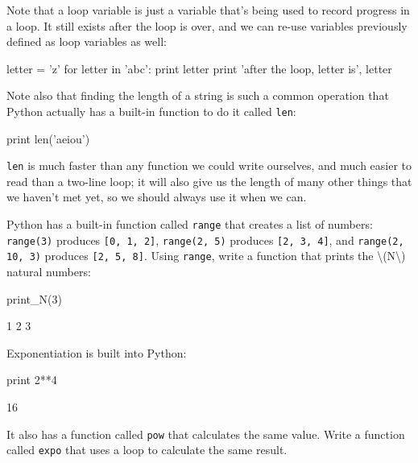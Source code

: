 Note that a loop variable is just a variable that's being used to record
progress in a loop. It still exists after the loop is over, and we can
re-use variables previously defined as loop variables as well:

\begin{VerbIn}
letter = 'z'
for letter in 'abc':
    print letter
print 'after the loop, letter is', letter
\end{VerbIn}

Note also that finding the length of a string is such a common operation
that Python actually has a built-in function to do it called
\texttt{len}:

\begin{VerbIn}
print len('aeiou')
\end{VerbIn}

\texttt{len} is much faster than any function we could write ourselves,
and much easier to read than a two-line loop; it will also give us the
length of many other things that we haven't met yet, so we should always
use it when we can.

\begin{challenge}
  Python has a built-in function called \texttt{range} that creates a
  list of numbers: \texttt{range(3)} produces \texttt{{[}0, 1, 2{]}},
  \texttt{range(2, 5)} produces \texttt{{[}2, 3, 4{]}}, and
  \texttt{range(2, 10, 3)} produces \texttt{{[}2, 5, 8{]}}. Using
  \texttt{range}, write a function that prints the
  \textbackslash{}(N\textbackslash{}) natural numbers:
\begin{VerbIn}
print_N(3)
\end{VerbIn}

\begin{VerbOut}
1 2 3
\end{VerbOut}
\end{challenge}

\begin{challenge}
  Exponentiation is built into Python:
\begin{VerbIn}
print 2**4
\end{VerbIn}

\begin{VerbOut}
16
\end{VerbOut}
  It also has a function called
  \texttt{pow} that calculates the same value. Write a function called
  \texttt{expo} that uses a loop to calculate the same result.
\end{challenge}


